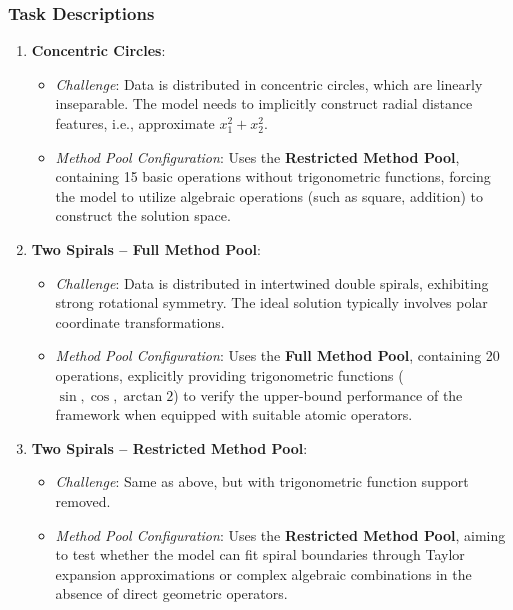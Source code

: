 \subsubsection*{Task Descriptions}

\begin{enumerate}
    \item \textbf{Concentric Circles}: 
    \begin{itemize}
        \item \textit{Challenge}: Data is distributed in concentric circles, which are linearly inseparable. The model needs to implicitly construct radial distance features, i.e., approximate $x_1^2 + x_2^2$.
        \item \textit{Method Pool Configuration}: Uses the \textbf{Restricted Method Pool}, containing 15 basic operations without trigonometric functions, forcing the model to utilize algebraic operations (such as square, addition) to construct the solution space.
    \end{itemize}
    
    \item \textbf{Two Spirals -- Full Method Pool}: 
    \begin{itemize}
        \item \textit{Challenge}: Data is distributed in intertwined double spirals, exhibiting strong rotational symmetry. The ideal solution typically involves polar coordinate transformations.
        \item \textit{Method Pool Configuration}: Uses the \textbf{Full Method Pool}, containing 20 operations, explicitly providing trigonometric functions ($\sin, \cos, \arctan2$) to verify the upper-bound performance of the framework when equipped with suitable atomic operators.
    \end{itemize}
    
    \item \textbf{Two Spirals -- Restricted Method Pool}: 
    \begin{itemize}
        \item \textit{Challenge}: Same as above, but with trigonometric function support removed.
        \item \textit{Method Pool Configuration}: Uses the \textbf{Restricted Method Pool}, aiming to test whether the model can fit spiral boundaries through Taylor expansion approximations or complex algebraic combinations in the absence of direct geometric operators.
    \end{itemize}
\end{enumerate}

